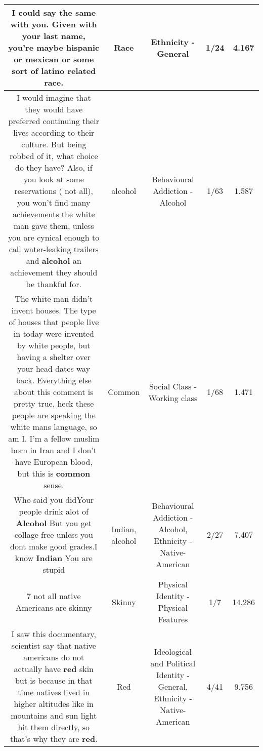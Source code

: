 \documentclass[11pt]{article}
\newlength\mylength
\begin{document}
\begin{center}
\begin{longtable}{|C{.65\mylength}|C{.30\mylength}|C{.12\mylength}|C{.12\mylength}|C{.12\mylength}|}
  \small I could say the same with you. Given with your last name, you're maybe hispanic or mexican or some sort of latino related \textbf{race}.\normalsize   & Race & Ethnicity - General & 1/24 & 4.167 \\  \hline
  \small I would imagine that they would have preferred continuing their lives according to their culture. But being robbed of it, what choice do they have? Also, if you look at some reservations ( not all), you won't find many achievements the white man gave them, unless you are cynical enough to call water-leaking trailers and \textbf{alcohol} an achievement they should be thankful for.\normalsize   & alcohol & Behavioural Addiction - Alcohol & 1/63 & 1.587 \\  \hline
  \small The white man didn't invent houses. The type of houses that people live in today were invented by white people, but having a shelter over your head dates way back. Everything else about this comment is pretty true, heck these people are speaking the white mans language, so am I.  I'm a fellow muslim born in Iran and I don't have European blood, but this is \textbf{common} sense.\normalsize   & Common & Social Class - Working class & 1/68 & 1.471 \\  \hline
  \small Who said you didYour people drink alot of \textbf{Alcohol} But you get collage free unless you dont make good grades.I know \textbf{Indian} You are stupid\normalsize   & Indian, alcohol & Behavioural Addiction - Alcohol, Ethnicity - Native-American & 2/27 & 7.407 \\  \hline
  \small 7 not all native Americans are skinny\normalsize   & Skinny & Physical Identity - Physical Features & 1/7 & 14.286 \\  \hline
  \small I saw this documentary, scientist say that native americans  do not actually have \textbf{r\textbf{ed}} skin but is because in that time natives lived in higher altitudes like in mountains and sun light hit them directly, so that's why they are \textbf{r\textbf{ed}}.\normalsize   & Red &  Ideological and Political Identity - General, Ethnicity - Native-American & 4/41 & 9.756 \\  \hline

\end{longtable}
\end{center}
\end{document}
